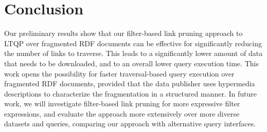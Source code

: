 \section{Conclusion}

Our preliminary results show that our filter-based link pruning approach to LTQP over fragmented RDF documents
can be effective for significantly reducing the number of links to traverse.
This leads to a significantly lower amount of data that needs to be downloaded,
and to an overall lower query execution time.
This work opens the possibility for faster traversal-based query execution over fragmented RDF documents,
provided that the data publisher uses hypermedia descriptions to characterize the fragmentation
in a structured manner.
In future work, we will investigate filter-based link pruning for more expressive filter expressions,
and evaluate the approach more extensively over more diverse datasets and queries, comparing our approach with alternative query interfaces.
